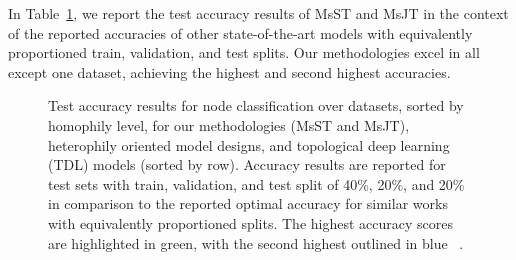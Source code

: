 In Table~\ref{tab:acc}, we report the test accuracy results of MsST and MsJT in the context of the reported accuracies of other state-of-the-art models with equivalently proportioned train, validation, and test splits. Our methodologies excel in all except one dataset, achieving the highest and second highest accuracies.
\begin{figure}[t]
    \centering
    \caption{\footnotesize{Test accuracy results for node classification over datasets, sorted by homophily level, for our methodologies (MsST and MsJT), heterophily oriented model designs, and topological deep learning (TDL) models (sorted by row). Accuracy results are reported for test sets with train, validation, and test split of 40\%, 20\%, and 20\% in comparison to the reported optimal accuracy for similar works with equivalently proportioned splits. The highest accuracy scores are highlighted in green, with the second highest outlined in blue ~\cite{feng2019hypergraph,huang2022revisiting,pei2020geom,zhu2020beyond,bodnar2022neural}.
}}
    \label{tab:acc}
\end{figure}
